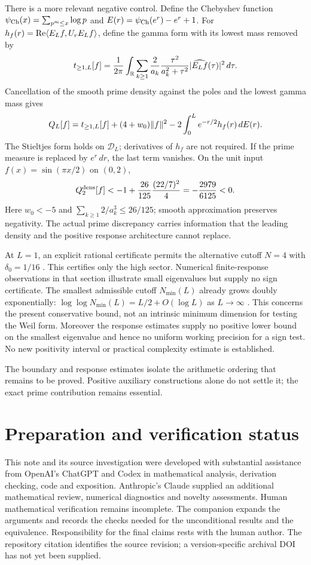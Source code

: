 There is a more relevant negative control. Define the Chebyshev function
$\psi_{\rm Ch}(x)=\sum_{p^m\le x}\log p$ and
$E(r)=\psi_{\rm Ch}(e^r)-e^r+1$. For
$h_f(r)=\operatorname{Re}\langle E_Lf,U_rE_Lf\rangle$, define the gamma form with its lowest
mass removed by
\[
t_{\ge1,L}[f]=\frac1{2\pi}\int_\mathbb R
\sum_{k\ge1}\frac2{a_k}\frac{\tau^2}{a_k^2+\tau^2}
|\widehat{E_Lf}(\tau)|^2\,d\tau.
\]
Cancellation of the smooth prime density against the poles and the
lowest gamma mass gives
\begin{equation}\label{eq:discrepancy}
Q_L[f]=t_{\ge1,L}[f]+(4+w_0)\lVert f\rVert^2
-2\int_0^L e^{-r/2}h_f(r)\,dE(r).
\end{equation}
The Stieltjes form holds on $\mathcal D_L$; derivatives of $h_f$ are not
required. If the prime measure is replaced by $e^r\,dr$, the last term
vanishes. On the unit input $f(x)=\sin(\pi x/2)$ on $(0,2)$,
\[
Q_2^{\rm dens}[f]<-1+\frac{26}{125}\frac{(22/7)^2}{4}
=-\frac{2979}{6125}<0.
\]
Here $w_0<-5$ and
$\sum_{k\ge1}2/a_k^3\le26/125$; smooth approximation preserves negativity.
The actual prime discrepancy carries information that the leading density
and the positive response architecture cannot replace.

At $L=1$, an explicit rational certificate permits the alternative cutoff
$N=4$ with $\delta_0=1/16$ \cite[Section 13]{Companion}.
This certifies only the high sector. Numerical finite-response observations
in that section illustrate small eigenvalues but supply no sign certificate.
The smallest admissible cutoff $N_{\min}(L)$ already grows doubly
exponentially: $\log\log N_{\min}(L)=L/2+O(\log L)$ as $L\to\infty$
\cite[Section 4]{Companion}. This concerns the present conservative bound,
not an intrinsic minimum dimension for testing the Weil form.
Moreover the response estimates supply no positive lower bound on the
smallest eigenvalue and hence no uniform working precision for a sign test.
No new positivity interval or practical complexity estimate is established.

The boundary and response estimates isolate the arithmetic ordering that
remains to be proved. Positive auxiliary constructions alone do not settle
it; the exact prime contribution remains essential.

\section*{Preparation and verification status}
This note and its source investigation were developed with substantial
assistance from OpenAI's ChatGPT and Codex in mathematical analysis,
derivation checking, code and exposition. Anthropic's Claude supplied an
additional mathematical review, numerical diagnostics and novelty assessments.
Human mathematical verification remains incomplete. The companion
\cite{Companion} expands the arguments and records the checks needed for
the unconditional results and the equivalence. Responsibility for the final
claims rests with the human author. The repository citation identifies the
source revision; a version-specific archival DOI has not yet been supplied.



